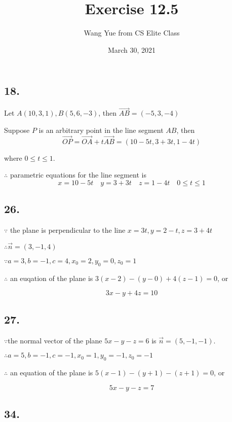 \documentclass{article}
\begin{document}
    \title{Exercise 12.5}
    \author{Wang Yue from CS Elite Class}
    \date{March 30, 2021}
    \maketitle

    \subsection*{18. }

    Let $A(10, 3, 1), B(5, 6, -3)$, then $\overrightarrow{AB} = (-5, 3, -4)$

    Suppose $P$ is an arbitrary point in the line segment $AB$, then $$\overrightarrow{OP} = \overrightarrow{OA} + t\overrightarrow{AB} = (10-5t, 3+3t, 1-4t)$$

    where $0 \leq t \leq 1$.

    $\therefore$ parametric equations for the line segment is $$ x = 10 - 5t \quad y = 3 + 3t \quad z = 1 - 4t \quad 0 \leq t \leq 1$$

    \subsection*{26. }

    $\because$ the plane is perpendicular to the line $x=3t,y=2-t,z=3+4t$

    $\therefore \overrightarrow{n} = (3, -1, 4)$

    $\because a=3, b=-1,c=4,x_0=2,y_0=0,z_0=1$

    $\therefore$ an euqation of the plane is $3(x-2) -(y-0) + 4(z-1) = 0$, or
    
    $$3x-y+4z=10$$

    \subsection*{27. }

    $\because $the normal vector of the plane $5x-y-z=6$ is $\overrightarrow{n} = (5, -1, -1)$.

    $\therefore a=5, b=-1,c=-1, x_0=1, y_0=-1, z_0=-1$

    $\therefore$ an equation of the plane is $5(x-1) -(y+1) - (z+1) = 0$, or

    $$5x-y-z=7$$

    \subsection*{34.}
\end{document}
